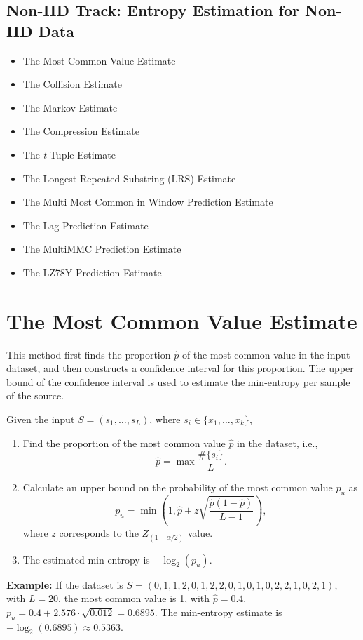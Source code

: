 \documentclass[12pt,openany]{book}
\theoremstyle{definition}
\begin{document}
\subsection*{Non-IID Track: Entropy Estimation for Non-IID Data}
\begin{itemize}
	\item The Most Common Value Estimate
	\item The Collision Estimate
	\item The Markov Estimate
	\item The Compression Estimate
	\item The \textit{t}-Tuple Estimate
	\item The Longest Repeated Substring (LRS) Estimate
	\item The Multi Most Common in Window Prediction Estimate
	\item The Lag Prediction Estimate
	\item The MultiMMC Prediction Estimate
	\item The LZ78Y Prediction Estimate
\end{itemize}


\section*{The Most Common Value Estimate}

This method first finds the proportion \(\hat{p}\) of the most common value in the input dataset, and then constructs a confidence interval for this proportion. The upper bound of the confidence interval is used to estimate the min-entropy per sample of the source.

Given the input \(S = (s_1, \ldots, s_L)\), where \(s_i \in \{x_1, \ldots, x_k\}\),
\begin{enumerate}
	\item Find the proportion of the most common value \(\hat{p}\) in the dataset, i.e.,
	\[\hat{p} = \max \frac{\#\{s_i\}}{L}.\]
	
	\item Calculate an upper bound on the probability of the most common value \(p_u\) as
	\[p_u = \min \left(1, \hat{p} + z \sqrt{\frac{\hat{p}(1-\hat{p})}{L-1}} \right),\]
	where \(z\) corresponds to the \(Z_{(1-\alpha/2)}\) value.
	
	\item The estimated min-entropy is \(-\log_2(p_u)\).
\end{enumerate}

\textbf{Example:} If the dataset is \(S = (0, 1, 1, 2, 0, 1, 2, 2, 0, 1, 0, 1, 0, 2, 2, 1, 0, 2, 1)\), with \(L = 20\), the most common value is 1, with \(\hat{p} = 0.4\). \(p_u = 0.4 + 2.576 \cdot \sqrt{0.012} = 0.6895\). The min-entropy estimate is \(-\log_2(0.6895) \approx 0.5363\).
\end{document}
